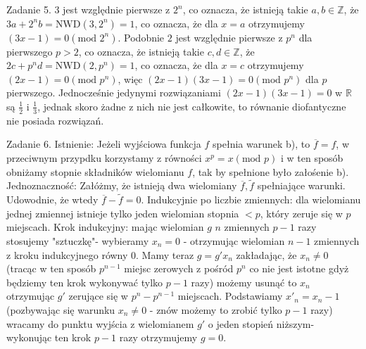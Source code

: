 \documentclass{article}
\begin{document}
Zadanie 5.
\newline
\newline
$3$ jest względnie pierwsze z $2^n$, co oznacza, że istnieją takie $a,b\in\mathbb{Z}$, że $3a+2^nb=\text{NWD}(3,2^n)=1$, co oznacza, że dla $x=a$ otrzymujemy $(3x-1)=0(\text{mod }2^n)$.
Podobnie $2$ jest względnie pierwsze z $p^n$ dla pierwszego $p>2$, co oznacza, że istnieją takie $c,d\in\mathbb{Z}$, że $2c+p^nd=\text{NWD}(2,p^n)=1$,
co oznacza, że dla $x=c$ otrzymujemy $(2x-1)=0(\text{mod }p^n)$, więc $(2x-1)(3x-1)=0(\text{mod }p^n)$ dla $p$ pierwszego.
Jednocześnie jedynymi rozwiązaniami $(2x-1)(3x-1)=0$ w $\mathbb{R}$ są $\frac{1}{2}$ i $\frac{1}{3}$, jednak skoro żadne z nich nie jest całkowite, to równanie diofantyczne nie posiada rozwiązań.
\newline

Zadanie 6.
\newline
\newline
Istnienie:\newline
Jeżeli wyjściowa funkcja $f$ spełnia warunek b), to $\overline{f}=f$, w przeciwnym przypdku korzystamy z równości $x^p=x(\text{mod }p)$
i w ten sposób obniżamy stopnie składników wielomianu $f$, tak by spełnione było załośenie b).\newline
Jednoznaczność:\newline
Załóżmy, że istnieją dwa wielomiany $\overline{f},\widetilde{f}$ spełniające warunki. Udowodnie, że wtedy $\overline{f}-\widetilde{f}=0$.
Indukcyjnie po liczbie zmiennych: dla wielomianu jednej zmiennej istnieje tylko jeden wielomian stopnia $<p$, który zeruje się w $p$ miejscach.
Krok indukcyjny: mając wielomian $g$ $n$ zmiennych $p-1$ razy stosujemy "sztuczkę"- wybieramy $x_n=0$ - otrzymując wielomian $n-1$ zmiennych z kroku indukcyjnego równy $0$.
Mamy teraz $g=g'x_n$ zakładając, że $x_n\neq 0$ (tracąc w ten sposób $p^{n-1}$ miejsc zerowych z pośród $p^n$ co nie jest istotne gdyż będziemy ten krok wykonywać tylko $p-1$ razy)
możemy usunąć to $x_n$ otrzymując $g'$ zerujące się w $p^n-p^{n-1}$ miejscach. Podstawiamy $x'_n=x_n-1$ (pozbywając się warunku $x_n\neq0$ - znów możemy to zrobić tylko $p-1$ razy)
wracamy do punktu wyjścia z wielomianem $g'$ o jeden stopień niższym- wykonując ten krok $p-1$ razy otrzymujemy $g=0$.
\end{document}
